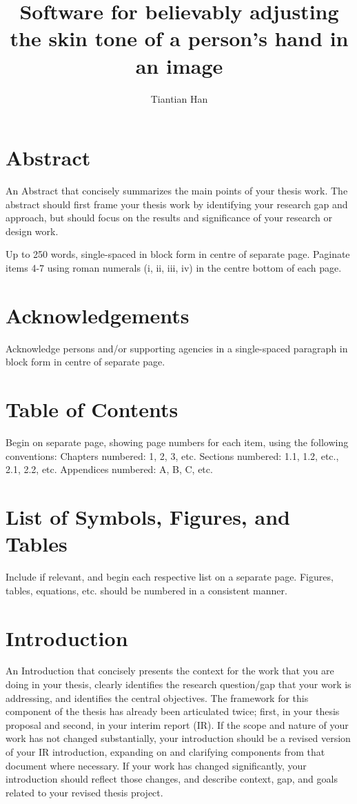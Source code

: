 \documentclass[12pt, a4paper]{article}
\title{Software for believably adjusting the skin tone of a person's hand in an image}
\author{Tiantian Han}
\begin{document}


\section*{Abstract}
An Abstract that concisely summarizes the main points of your thesis work. The abstract should first frame your thesis work by identifying your research gap and approach, but should focus on the results and significance of your research or design work.

Up to 250 words, single-spaced in block form in centre of separate page. Paginate items 4-7 using roman numerals (i, ii, iii, iv) in the centre bottom of each page.
\pagebreak

\section*{Acknowledgements}
Acknowledge persons and/or supporting agencies in a single-spaced paragraph in block form in centre of separate page.
\pagebreak

\section*{Table of Contents}
Begin on separate page, showing page numbers for each item, using the following conventions:
Chapters numbered: 1, 2, 3, etc.
Sections numbered: 1.1, 1.2, etc., 2.1, 2.2, etc. Appendices numbered: A, B, C, etc.
\pagebreak

\section*{List of Symbols, Figures, and Tables}
Include if relevant, and begin each respective list on a separate page. Figures, tables, equations, etc. should be numbered in a consistent manner.
\pagebreak

\section{Introduction}
An Introduction that concisely presents the context for the work that you are doing in your thesis, clearly identifies the research question/gap that your work is addressing, and identifies the central objectives. The framework for this component of the thesis has already been articulated twice; first, in your thesis proposal and second, in your interim report (IR). If the scope and nature of your work has not changed substantially, your introduction should be a revised version of your IR introduction, expanding on and clarifying components from that document where necessary. If your work has changed significantly, your introduction should reflect those changes, and describe context, gap, and goals related to your revised thesis project.
\pagebreak
\end{document}
